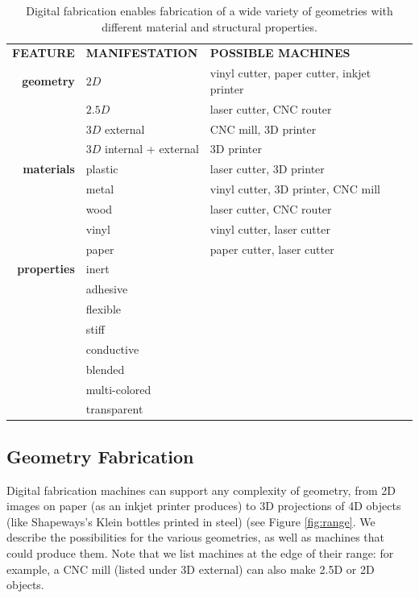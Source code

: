 \begin{table}
\begin{center}
\begin{tabular}{rll}
\textbf{FEATURE}& \textbf{MANIFESTATION} & \textbf{POSSIBLE MACHINES} \\
\textbf{geometry} & $2D$ & vinyl cutter, paper cutter, inkjet printer \\
& $2.5D$ & laser cutter, CNC router \\
& $3D$ external & CNC mill, 3D printer \\
& $3D$ internal + external & 3D printer \\
\textbf{materials} & plastic & laser cutter, 3D printer \\
& metal & vinyl cutter, 3D printer, CNC mill \\
& wood & laser cutter, CNC router \\
& vinyl & vinyl cutter, laser cutter \\
& paper & paper cutter, laser cutter \\
\textbf{properties} & inert & \\
& adhesive & \\
& flexible & \\
& stiff & \\
& conductive & \\
& blended & \\
& multi-colored & \\
& transparent & \\
\end{tabular}
\end{center}
\caption{Digital fabrication enables fabrication of a wide variety of geometries with different material and structural properties. }
\label{table:properties}
\end{table}

\subsection{Geometry Fabrication}

Digital fabrication machines can support any complexity of geometry, from 2D images on paper (as an inkjet printer produces) to 3D projections of 4D objects (like Shapeways's Klein bottles printed in steel) (see Figure \ref{fig:range}. We describe the possibilities for the various geometries, as well as machines that could produce them. Note that we list machines at the edge of their range: for example, a CNC mill (listed under 3D external) can also make 2.5D or 2D objects.

